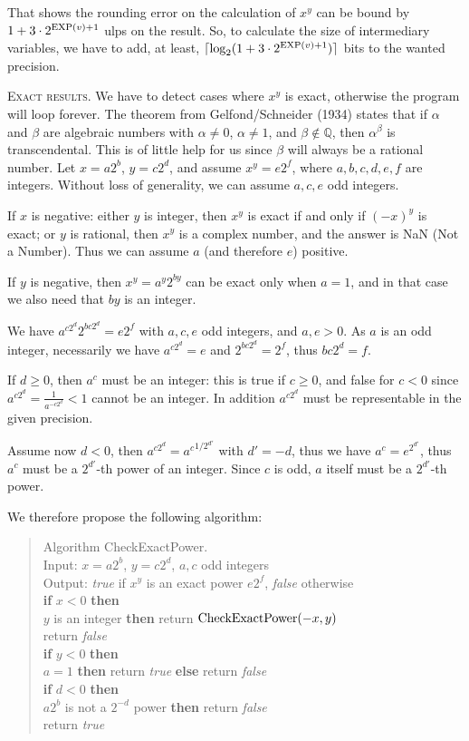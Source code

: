 \documentclass[12pt]{amsart}
\def\q{\hspace*{5mm}}
\def\Exp{{\rm EXP}}
\def\Q{{\mathbb Q}}
\begin{document}
That shows the rounding error on the calculation of $x^y$
can be bound by $1 + 3 \cdot 2^{\Exp(v)+1}$ ulps on the result. So,
to calculate the size of intermediary variables, we have to add, at
least, $\lceil \log_2 (1+3 \cdot 2^{\Exp(v)+1}) \rceil$ bits to the wanted
precision.

\noindent
\textsc{Exact results.}
We have to detect cases where $x^y$ is exact, otherwise the program will
loop forever.
The theorem from Gelfond/Schneider (1934) states that if $\alpha$ and
$\beta$ are algebraic numbers with $\alpha \neq 0$, $\alpha \neq 1$,
and $\beta \notin \Q$, then $\alpha^{\beta}$ is transcendental.
This is of little help for us since $\beta$ will always be a rational
number.
Let $x = a 2^b$, $y = c 2^d$, and assume $x^y = e 2^f$, where
$a, b, c, d, e, f$ are integers.
Without loss of generality, we can assume $a, c, e$ odd integers.

If $x$ is negative: either $y$ is integer, then $x^y$ is exact if and only if
$(-x)^y$ is exact; or $y$ is rational, then $x^y$ is a complex number,
and the answer is NaN (Not a Number).
Thus we can assume $a$ (and therefore $e$) positive.

If $y$ is negative, then $x^y = a^y 2^{b y}$ can be exact only when
$a=1$, and in that case we also need that $b y$ is an integer.

We have $a^{c 2^d} 2^{b c 2^d} = e 2^f$ with $a, c, e$ odd integers,
and $a, e > 0$.
As $a$ is an odd integer, necessarily we have $a^{c 2^d} = e$
and $2^{b c 2^d} = 2^f$, thus $b c 2^d = f$.

If $d \geq 0$, then $a^c$ must be an integer: this is true if $c \geq 0$,
and false for $c < 0$ since $a^{c 2^d} = \frac{1}{a^{-c 2^d}} < 1$ cannot be an
integer. In addition $a^{c 2^d}$ must be representable in the given precision.

Assume now $d < 0$,
then $a^{c 2^d} = {a^c}^{1/2^{d'}}$ with $d'=-d$, thus
we have $a^c = e^{2^{d'}}$, thus $a^c$ must be a $2^{d'}$-th power
of an integer.
Since $c$ is odd, $a$ itself must be a $2^{d'}$-th power.

We therefore propose the following algorithm:
\begin{quote}
Algorithm CheckExactPower. \\
Input: $x=a 2^b$, $y=c 2^d$, $a, c$ odd integers \\
Output: \emph{true} if $x^y$ is an exact power $e 2^f$, \emph{false} otherwise\\
{\bf if} $x < 0$ {\bf then} \\
\q {\bf if} $y$ is an integer {\bf then} return ${\rm CheckExactPower}(-x,y)$\\
\q {\bf else} return \emph{false} \\
{\bf if} $y < 0$ {\bf then} \\
\q {\bf if} $a=1$ {\bf then} return \emph{true} {\bf else} return \emph{false}\\
{\bf if} $d < 0$ {\bf then} \\
\q {\bf if} $a 2^b$ is not a $2^{-d}$ power {\bf then} return \emph{false} \\
return \emph{true}
\end{quote}
\end{document}
